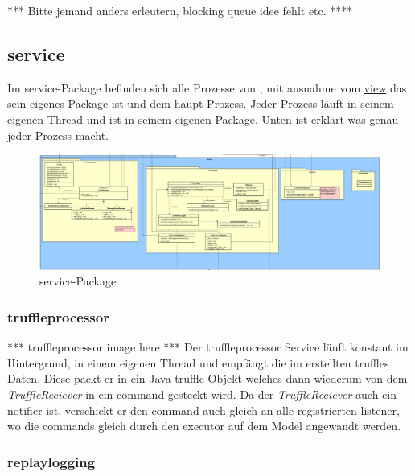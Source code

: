       *** Bitte jemand anders erleutern, blocking queue idee fehlt etc. ****


\subsection{service}
\label{subsec:service}

Im service-Package befinden sich alle Prozesse von \programname,
mit ausnahme vom \hyperref[subsec:view]{view} das sein eigenes Package ist und dem
haupt Prozess. Jeder Prozess läuft in seinem eigenen Thread und ist in seinem
eigenen Package. Unten ist erklärt was genau jeder Prozess macht.

\begin{figure}[H]
  \centering
  \includegraphics[width=\textwidth]{../diagramimages/service.png}
  \caption{service-Package}
  \medskip
\end{figure}

    \subsubsection{truffleprocessor}
    \label{subsubsec:truffleprocessor}

    *** truffleprocessor image here ***
    \newline
    \newline
    Der truffleprocessor Service läuft konstant im Hintergrund, in einem eigenen Thread
    und empfängt die im \sppname erstellten \glspl{truffle} Daten.
    Diese packt er in ein Java \gls{truffle} Objekt welches dann wiederum von dem
    \textit{TruffleReciever} in ein \gls{command} gesteckt wird. Da der \textit{TruffleReciever}
    auch ein \gls{notifier} ist, verschickt er den \gls{command} auch gleich an
    alle registrierten \gls{listener}, wo die \glspl{command} gleich durch den
    \gls{executor} auf dem Model angewandt werden.

    \subsubsection{replaylogging}
    \label{subsubsec:replaylogging}

